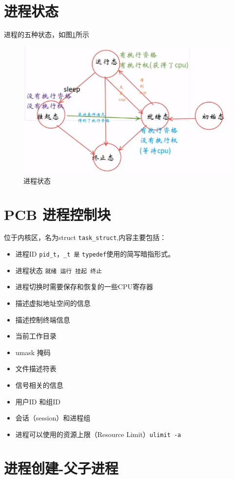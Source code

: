 \documentclass[UTF8,a4paper,12pt]{ctexbook}
\begin{document}
	\section{进程状态}
		进程的五种状态，如图\ref{proceeStat}所示
			\begin{figure}[H]
				\centering
				\includegraphics[scale=0.6]{proceeStat.png}
				\caption{进程状态}
				\label{proceeStat}
			\end{figure}
		
	
	\section{PCB 进程控制块}
		位于内核区，名为struct \verb|task_struct|,内容主要包括：
			\begin{itemize}[itemindent = 1em ]
				\item 进程ID \verb|pid_t|，\verb|_t 是| \verb|typedef|使用的简写暗指形式。
				\item 进程状态 \verb|就绪 运行 挂起 终止|
				\item 进程切换时需要保存和恢复的一些CPU寄存器
				\item 描述虚拟地址空间的信息
				\item 描述控制终端信息
				\item 当前工作目录
				\item umask 掩码
				\item 文件描述符表
				\item 信号相关的信息
				\item 用户ID 和组ID
				\item 会话（session）和进程组
				\item 进程可以使用的资源上限（Resource Limit）\verb|ulimit -a|
			\end{itemize}
		
		
	
	\section{进程创建-父子进程}	
\end{document}
